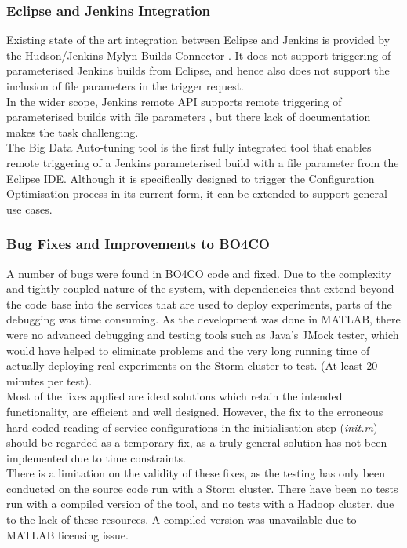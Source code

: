 \subsubsection{Eclipse and Jenkins Integration}
Existing state of the art integration between Eclipse and Jenkins is provided by the Hudson/Jenkins Mylyn Builds Connector \cite{mylyn}. It does not support triggering of parameterised Jenkins builds from Eclipse, and hence also does not support the inclusion of file parameters in the trigger request.\\
In the wider scope, Jenkins remote API supports remote triggering of parameterised builds with file parameters \cite{pbuild}, but there lack of documentation makes the task challenging.\\
The Big Data Auto-tuning tool is the first fully integrated tool that enables remote triggering of a Jenkins parameterised build with a file parameter from the Eclipse IDE. Although it is specifically designed to trigger the Configuration Optimisation process in its current form, it can be extended to support general use cases.

\subsubsection{Bug Fixes and Improvements to BO4CO}
A number of bugs were found in BO4CO code and fixed. Due to the complexity and tightly coupled nature of the system, with dependencies that extend beyond the code base into the services that are used to deploy experiments,  parts of the debugging was time consuming. As the development was done in MATLAB, there were no advanced debugging and testing tools such as Java's JMock tester, which would have helped to eliminate problems and the very long running time of actually deploying real experiments on the Storm cluster to test. (At least 20 minutes per test).\\
Most of the fixes applied are ideal solutions which retain the intended functionality, are efficient and well designed. However, the fix to the erroneous hard-coded reading of service configurations in the initialisation step (\textit{init.m}) should be regarded as a temporary fix, as a truly general solution has not been implemented due to time constraints.\\
There is a limitation on the validity of these fixes, as the testing has only been conducted on the source code run with a Storm cluster. There have been no tests run with a compiled version of the tool, and no tests with a Hadoop cluster, due to the lack of these resources. A compiled version was unavailable due to MATLAB licensing issue.

